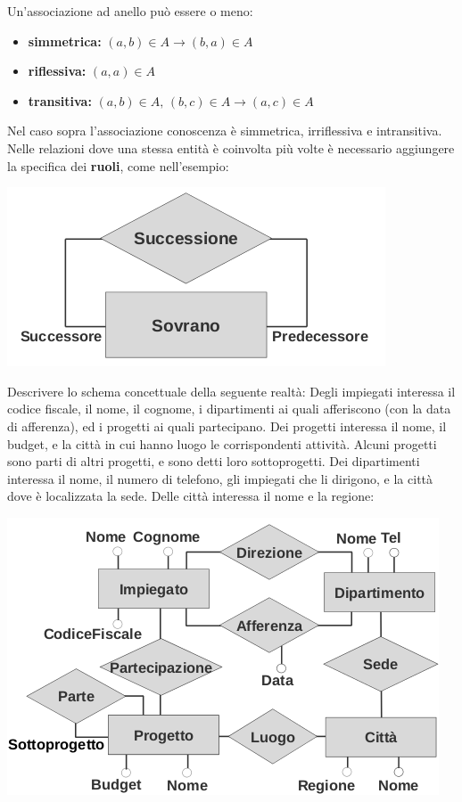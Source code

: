 \documentclass[a4paper,12pt, oneside]{book}
\begin{document}
Un'associazione ad anello può essere o meno:
\begin{itemize}
\item \textbf{simmetrica:} $(a,b)\in A\to (b,a)\in A$
\item \textbf{riflessiva:} $(a,a)\in A$
\item \textbf{transitiva:} $(a,b)\in A,\,(b,c)\in A \to (a,c)\in A$
\end{itemize}
Nel caso sopra l'associazione conoscenza è simmetrica,
irriflessiva e intransitiva.\\
Nelle relazioni dove una stessa entità è coinvolta più volte è necessario aggiungere la specifica dei \textbf{ruoli}, come nell'esempio:
\begin{center}
\includegraphics[scale=2.5]{img/bas8.png}
\end{center}
\newpage
\begin{esempio}
Descrivere lo schema concettuale della seguente
realtà:
Degli impiegati interessa il codice fiscale, il nome, il
cognome, i dipartimenti ai quali afferiscono (con la
data di afferenza), ed i progetti ai quali partecipano.
Dei progetti interessa il nome, il budget, e la città in
cui hanno luogo le corrispondenti attività. Alcuni
progetti sono parti di altri progetti, e sono detti loro
sottoprogetti. Dei dipartimenti interessa il nome, il
numero di telefono, gli impiegati che li dirigono, e la
città dove è localizzata la sede. Delle città interessa
il nome e la regione:
\begin{center}
\includegraphics[scale=3]{img/er.png}
\end{center}
\end{esempio}
\end{document}
